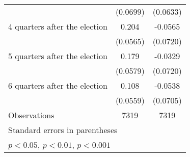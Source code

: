 \begin{table}[htbp]
\begin{tabular}{l*{2}{c}}
                    &    (0.0699)         &    (0.0633)         \\
[1em]
 4 quarters after the election&       0.204\sym{***}&     -0.0565         \\
                    &    (0.0565)         &    (0.0720)         \\
[1em]
 5 quarters after the election&       0.179\sym{**} &     -0.0329         \\
                    &    (0.0579)         &    (0.0720)         \\
[1em]
 6 quarters after the election&       0.108         &     -0.0538         \\
                    &    (0.0559)         &    (0.0705)         \\
\hline
Observations        &        7319         &        7319         \\
\hline\hline
\multicolumn{3}{l}{\footnotesize Standard errors in parentheses}\\
\multicolumn{3}{l}{\footnotesize \sym{*} \(p<0.05\), \sym{**} \(p<0.01\), \sym{***} \(p<0.001\)}\\
\end{tabular}
\end{table}
